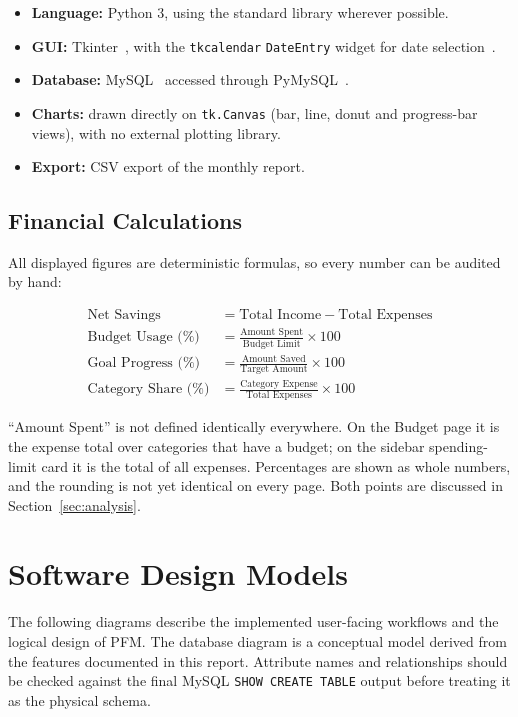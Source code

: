 \documentclass{tietreport}
\begin{document}
\begin{itemize}
  \item \textbf{Language:} Python 3, using the standard library
    wherever possible.
  \item \textbf{GUI:} Tkinter~\cite{pythontkinter}, with the
    \texttt{tkcalendar} \texttt{DateEntry} widget for date
    selection~\cite{tkcalendardocs}.
  \item \textbf{Database:} MySQL~\cite{mysqlmanual} accessed
    through PyMySQL~\cite{pymysqldocs}.
  \item \textbf{Charts:} drawn directly on \texttt{tk.Canvas}
    (bar, line, donut and progress-bar views), with no external
    plotting library.
  \item \textbf{Export:} CSV export of the monthly report.
\end{itemize}

\subsection{Financial Calculations}

All displayed figures are deterministic formulas, so every number
can be audited by hand:

\begin{align*}
  \text{Net Savings} &= \text{Total Income} - \text{Total Expenses}\\
  \text{Budget Usage (\%)} &= \frac{\text{Amount Spent}}{\text{Budget Limit}} \times 100\\
  \text{Goal Progress (\%)} &= \frac{\text{Amount Saved}}{\text{Target Amount}} \times 100\\
  \text{Category Share (\%)} &= \frac{\text{Category Expense}}{\text{Total Expenses}} \times 100
\end{align*}

``Amount Spent'' is not defined identically everywhere. On the
Budget page it is the expense total over categories that have a
budget; on the sidebar spending-limit card it is the total of all
expenses. Percentages are shown as whole numbers, and the rounding
is not yet identical on every page. Both points are discussed in
Section~\ref{sec:analysis}.

\section{Software Design Models}

The following diagrams describe the implemented user-facing workflows and the
logical design of PFM. The database diagram is a conceptual model derived from
the features documented in this report. Attribute names and relationships
should be checked against the final MySQL \texttt{SHOW CREATE TABLE} output
before treating it as the physical schema.
\end{document}
